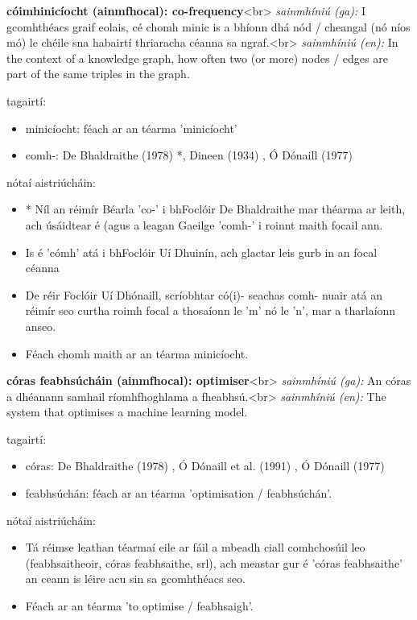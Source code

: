 \documentclass{article}
\begin{document}
\textbf{cóimhinicíocht (ainmfhocal): co-frequency}<br>
\textit{sainmhíniú (ga):} I gcomhthéacs graif eolais, cé chomh minic is a bhíonn dhá nód / cheangal (nó níos mó) le chéile sna habairtí thriaracha céanna sa ngraf.<br>
\textit{sainmhíniú (en):} In the context of a knowledge graph, how often two (or more) nodes / edges are part of the same triples in the graph.

tagairtí:
\begin{itemize}
	\item minicíocht: féach ar an téarma 'minicíocht'
	\item comh-: De Bhaldraithe (1978) \cite{de-bhaldraithe}*, Dineen (1934) \cite{dineen}, Ó Dónaill (1977) \cite{odonaill}
\end{itemize}

nótaí aistriúcháin:
\begin{itemize}
	\item * Níl an réimír Béarla 'co-' i bhFoclóir De Bhaldraithe mar théarma ar leith, ach úsáidtear é (agus a leagan Gaeilge 'comh-' i roinnt maith focail ann.
	\item Is é 'cómh' atá i bhFoclóir Uí Dhuinín, ach glactar leis gurb in an focal céanna
	\item De réir Foclóir Uí Dhónaill, scríobhtar có(i)- seachas comh- nuair atá an réimír seo curtha roimh focal a thosaíonn le 'm' nó le 'n', mar a tharlaíonn anseo.
	\item Féach chomh maith ar an téarma minicíocht.
\end{itemize}


\textbf{córas feabhsúcháin (ainmfhocal): optimiser}<br>
\textit{sainmhíniú (ga):} An córas a dhéanann samhail ríomhfhoghlama a fheabhsú.<br>
\textit{sainmhíniú (en):} The system that optimises a machine learning model.

tagairtí:
\begin{itemize}
	\item córas: De Bhaldraithe (1978) \cite{de-bhaldraithe}, Ó Dónaill et al. (1991) \cite{focloir-beag}, Ó Dónaill (1977) \cite{odonaill}
	\item feabhsúchán: féach ar an téarma 'optimisation / feabhsúchán'.
\end{itemize}

nótaí aistriúcháin:
\begin{itemize}
	\item Tá réimse leathan téarmaí eile ar fáil a mbeadh ciall comhchosúil leo (feabhsaitheoir, córas feabhsaithe, srl), ach meastar gur é 'córas feabhsaithe' an ceann is léire acu sin sa gcomhthéacs seo.
	\item Féach ar an téarma 'to optimise / feabhsaigh'.
\end{itemize}
\end{document}
